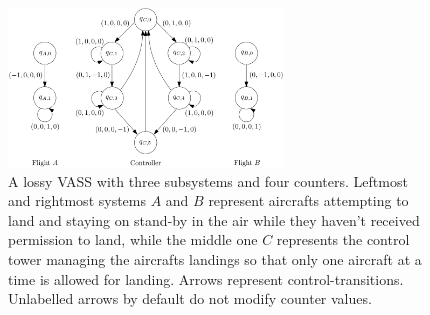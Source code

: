  
\begin{center}
	\begin{figure}
			\hspace{2cm}
\includegraphics[width=0.65\textwidth]{FigureB}
	\caption{A lossy VASS with three subsystems and four counters. Leftmost and rightmost systems $A$ and $B$ represent aircrafts attempting to land and staying on stand-by in the air while they haven't received permission to land, while the middle one $C$ represents the control tower managing the aircrafts landings so that only one aircraft at a time is allowed for landing. Arrows represent control-transitions. Unlabelled arrows by default do not modify counter values.}
					\label{air control}
	\end{figure}
\end{center}

